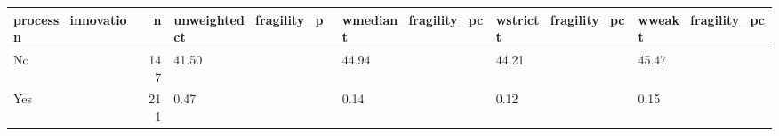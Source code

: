 \begin{tabular}{lrllll}
\toprule
process\_innovation & n & unweighted\_fragility\_pct & wmedian\_fragility\_pct & wstrict\_fragility\_pct & wweak\_fragility\_pct \\
\midrule
No & 147 & 41.50 & 44.94 & 44.21 & 45.47 \\
Yes & 211 & 0.47 & 0.14 & 0.12 & 0.15 \\
\bottomrule
\end{tabular}
